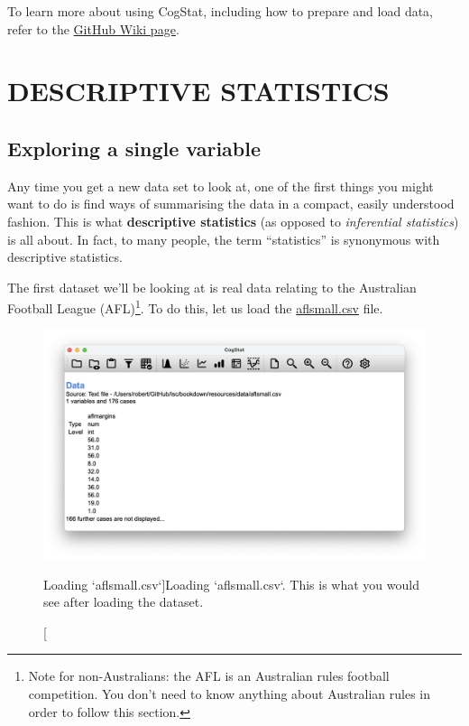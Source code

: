 \documentclass[
  11pt,
]{book}
\theoremstyle{definition}
\theoremstyle{definition}
\theoremstyle{definition}
\theoremstyle{definition}
\theoremstyle{remark}
\begin{document}
To learn more about using CogStat, including how to prepare and load data, refer to the \href{https://github.com/cogstat/cogstat/wiki/Documentation-for-users}{GitHub Wiki page}.

\hypertarget{part-descriptive-statistics}{%
\part*{DESCRIPTIVE STATISTICS}\label{part-descriptive-statistics}}

\hypertarget{exploringavariable}{%
\chapter{Exploring a single variable}\label{exploringavariable}}

Any time you get a new data set to look at, one of the first things you might want to do is find ways of summarising the data in a compact, easily understood fashion. This is what \textbf{descriptive statistics} (as opposed to \emph{inferential statistics}) is all about. In fact, to many people, the term ``statistics'' is synonymous with descriptive statistics.

The first dataset we'll be looking at is real data relating to the Australian Football League (AFL)\footnote{Note for non-Australians: the AFL is an Australian rules football competition. You don't need to know anything about Australian rules in order to follow this section.}. To do this, let us load the \href{resources/data/aflsmall.csv}{aflsmall.csv} file.

\begin{figure}

{\centering \includegraphics[width=0.66\linewidth]{resources/image/loadaflsmall} 

}

\caption[Loading `aflsmall.csv`]{Loading `aflsmall.csv`. This is what you would see after loading the dataset.}\label{fig:loadaflsmall}
\end{figure}
\end{document}
